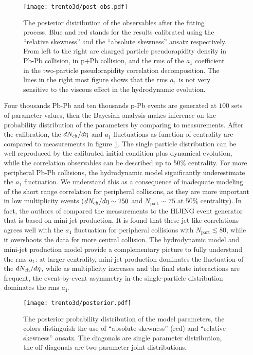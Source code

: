 \begin{figure}
\texttt{[image: trento3d/post\_obs.pdf]}
\caption{The posterior distribution of the observables after the fitting process. Blue and red stands for the results calibrated using the ``relative skewness'' and the ``absolute skewness'' ansatz respectively.
From left to the right are charged particle pseudorapidity density in Pb-Pb collision, in p+Pb collision, and the rms of the $a_1$ coefficient in the two-particle pseudorapidity correlation decomposition. The lines in the right most figure shows that the rms $a_1$ is not very sensitive to the viscous effect in the hydrodynamic evolution.}
\label{fig:trento:post_obs}
\end{figure}

Four thousands Pb-Pb and ten thousands p-Pb events are generated at $100$ sets of parameter values, then the Bayesian analysis makes inference on the probability distribution of the parameters by comparing to measurements.
After the calibration, the $dN_\text{ch}/d\eta$ and $a_1$ fluctuations as function of centrality are compared to measurements in figure \ref{fig:trento:post_obs}.
The single particle distribution can be well reproduced by the calibrated initial condition plus dynamical evolution, while the correlation observables can be described up to 50\% centrality. 
For more peripheral Pb-Pb collisions, the hydrodynamic model significantly underestimate the $a_1$ fluctuation.
We understand this as a consequence of inadequate modeling of the short range correlation for peripheral collisions, as they are more important in low multiplicity events ($dN_\text{ch}/d\eta\sim 250$ and $N_{\textrm{part}} \sim 75$ at 50\% centrality).
In fact, the authors of \cite{ATLAS:2015kla} compared the measurements to the HIJING event generator that is based on mini-jet production.
It is found that these jet-like correlations agrees well with the $a_1$ fluctuation for peripheral collisions with $N_{\textrm{part}} \lesssim 80$, while it overshoots the data for more central collision.
The hydrodynamic model and mini-jet production model provide a complementary picture to fully understand the rms $a_1$: at larger centrality, mini-jet production dominates the fluctuation of the $dN_\text{ch}/d\eta$, while as multiplicity increases and the final state interactions are frequent, the event-by-event asymmetry in the single-particle distribution dominates the rms $a_1$.

\begin{figure}
\centering
\texttt{[image: trento3d/posterior.pdf]}
\caption{The posterior probability distribution of the model parameters, the colors distinguish the use of ``absolute skewness'' (red) and ``relative skewness'' ansatz. The diagonals are single parameter distribution, the off-diagonals are two-parameter joint distributions.}
\label{fig:trento:posterior}
\end{figure}

